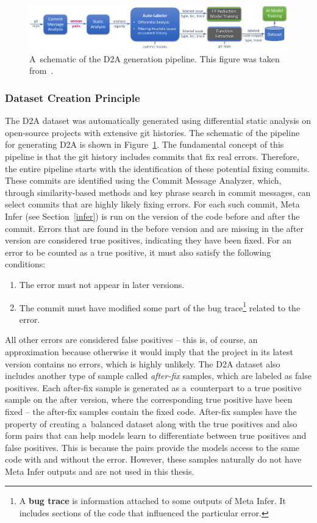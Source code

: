 \begin{figure}[t]
	\centering
	\includegraphics[width=1\textwidth]{figures/d2a-pipeline.png}
	\caption{A~schematic of the D2A generation pipeline. This figure was taken from~\cite{D2A-zheng2021d2a}.}
	\label{figure:d2a-pipeline}
\end{figure}

\subsubsection{Dataset Creation Principle}
The D2A dataset was automatically generated using differential static analysis on open-source projects with extensive git histories. The schematic of the pipeline for generating D2A is shown in Figure~\ref{figure:d2a-pipeline}. The fundamental concept of this pipeline is that the git history includes commits that fix real errors. Therefore, the entire pipeline starts with the identification of these potential fixing commits. These commits are identified using the Commit Message Analyzer, which, through similarity-based methods and key phrase search in commit messages, can select commits that are highly likely fixing errors. For each such commit, Meta Infer (see Section~\ref{infer}) is run on the version of the code before and after the commit. Errors that are found in the before version and are missing in the after version are considered true positives, indicating they have been fixed. For an error to be counted as a true positive, it must also satisfy the following conditions:
\begin{enumerate}
    \item The error must not appear in later versions.
    \item The commit must have modified some part of the bug trace\footnote{A \textbf{bug trace} is information attached to some outputs of Meta Infer. It includes sections of the code that influenced the particular error.} related to the error.
\end{enumerate}

All other errors are considered false positives -- this is, of course, an approximation because otherwise it would imply that the project in its latest version contains no errors, which is highly unlikely. The D2A dataset also includes another type of sample called \textit{after-fix} samples, which are labeled as false positives. Each after-fix sample is generated as a~counterpart to a true positive sample on the after version, where the corresponding true positive have been fixed -- the after-fix samples contain the fixed code. After-fix samples have the property of creating a~balanced dataset along with the true positives and also form pairs that can help models learn to differentiate between true positives and false positives. This is because the pairs provide the models access to the same code with and without the error. However, these samples naturally do not have Meta Infer outputs and are not used in this thesis.

